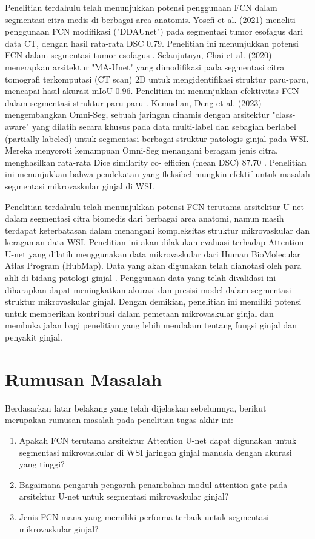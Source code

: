 \noindent Penelitian terdahulu telah menunjukkan potensi penggunaan FCN dalam segmentasi citra medis di berbagai area anatomis. Yosefi et al. (2021) meneliti penggunaan FCN modifikasi ("DDAUnet") pada segmentasi tumor esofagus dari data CT, dengan hasil rata-rata DSC 0.79. Penelitian ini menunjukkan potensi FCN dalam segmentasi tumor esofagus \cite{yousefi_esophageal_2021}. Selanjutnya, Chai et al. (2020) menerapkan arsitektur "MA-Unet" yang dimodifikasi pada segmentasi citra tomografi terkomputasi (CT scan) 2D untuk mengidentifikasi struktur paru-paru, mencapai hasil akurasi mIoU 0.96. Penelitian ini menunjukkan efektivitas FCN dalam segmentasi struktur paru-paru \cite{cai_ma-unet_2020}. Kemudian, Deng et al. (2023) mengembangkan Omni-Seg, sebuah jaringan dinamis dengan arsitektur "class-aware" yang dilatih secara khusus pada data multi-label dan sebagian berlabel (partially-labeled) untuk segmentasi berbagai struktur patologis ginjal pada WSI. Mereka menyoroti kemampuan Omni-Seg menangani beragam jenis citra, menghasilkan rata-rata Dice similarity co-
efficien (mean DSC) 87.70 \cite{deng_omni-seg_2022}. Penelitian ini menunjukkan bahwa pendekatan yang fleksibel mungkin efektif untuk masalah segmentasi mikrovaskular ginjal di WSI.

\noindent Penelitian terdahulu telah menunjukkan potensi FCN terutama arsitektur U-net dalam segmentasi citra biomedis dari berbagai area anatomi, namun masih terdapat keterbatasan dalam menangani kompleksitas struktur mikrovaskular dan keragaman data WSI. Penelitian ini akan dilakukan evaluasi terhadap Attention U-net yang dilatih menggunakan data mikrovaskular dari Human BioMolecular Atlas Program (HubMap). Data yang akan digunakan telah dianotasi oleh para ahli di bidang patologi ginjal \cite{howard_hubmap_2023}. Penggunaan data yang telah divalidasi ini diharapkan dapat meningkatkan akurasi dan presisi model dalam segmentasi struktur mikrovaskular ginjal. Dengan demikian, penelitian ini memiliki potensi untuk memberikan kontribusi dalam pemetaan mikrovaskular ginjal dan membuka jalan bagi penelitian yang lebih mendalam tentang fungsi ginjal dan penyakit ginjal. 

\section{Rumusan Masalah}
\noindent Berdasarkan latar belakang yang telah dijelaskan sebelumnya, berikut merupakan rumusan masalah pada penelitian tugas akhir ini:
\begin{enumerate}
    \item Apakah FCN terutama arsitektur Attention U-net dapat digunakan untuk segmentasi mikrovaskular di WSI jaringan ginjal manusia dengan akurasi yang tinggi?
    \item Bagaimana pengaruh pengaruh penambahan modul attention gate pada arsitektur U-net untuk segmentasi mikrovaskular ginjal?
    \item Jenis FCN mana yang memiliki performa terbaik untuk segmentasi mikrovaskular ginjal?
\end{enumerate}

